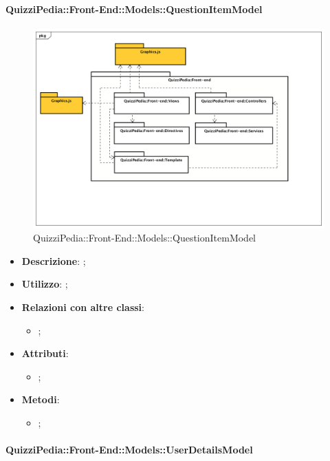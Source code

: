 		\paragraph{QuizziPedia::Front-End::Models::QuestionItemModel}
		
			\label{QuizziPedia::Front-End::Models::QuestionItemModel}
			
			\begin{figure}[h]
				\centering
				\includegraphics[scale=0.5,keepaspectratio]{UML/Package/QuizziPedia_Front-end.png}
				\caption{QuizziPedia::Front-End::Models::QuestionItemModel}
			\end{figure}
			
			\begin{itemize}
				\item \textbf{Descrizione}: ;
				\item \textbf{Utilizzo}: ;
				\item \textbf{Relazioni con altre classi}: 
				\begin{itemize}
					\item ;
				\end{itemize}
				\item \textbf{Attributi}: 
				\begin{itemize}
					\item ;
				\end{itemize}
				\item \textbf{Metodi}: 
				\begin{itemize}
					\item ;
				\end{itemize}
			\end{itemize}
		
		\paragraph{QuizziPedia::Front-End::Models::UserDetailsModel}
		
